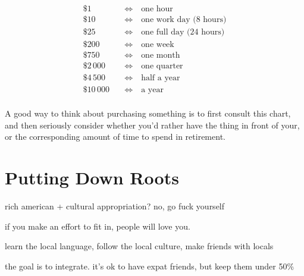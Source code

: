 \documentclass[]{book}
\newcommand{\undefine}[1]{\let#1\undefined}
\begin{document}
\newcommand{\xx}[2]{\$#1 &\quad\iff\quad \text{#2}\\}
\begin{align*}
  \xx{1}{one hour}
  \xx{10}{one work day (8 hours)}
  \xx{25}{one full day (24 hours)}
  \xx{200}{one week}
  \xx{750}{one month}
  \xx{2\,000}{one quarter}
  \xx{4\,500}{half a year}
  \xx{10\,000}{a year}
\end{align*}
\undefine\xx

A good way to think about purchasing something is to first consult this chart,
and then seriously consider whether you'd rather have the thing in front of
your, or the corresponding amount of time to spend in retirement.



\chapter{Putting Down Roots}

rich american + cultural appropriation? no, go fuck yourself

if you make an effort to fit in, people will love you.

learn the local language, follow the local culture, make friends with locals

the goal is to integrate. it's ok to have expat friends, but keep them under 50\%
\end{document}

